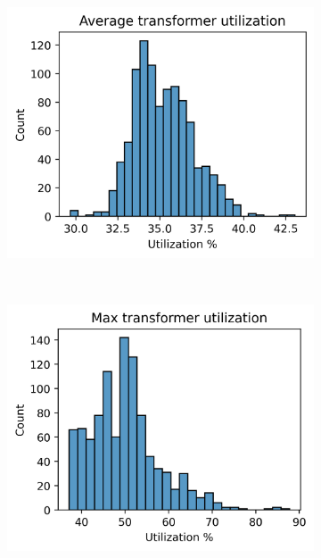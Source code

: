 \begin{figure}[H]
\begin{subfigure}{.33\textwidth}
    \caption{}
    \label{fig:result:suburban:histograms:max_cable}
  \end{subfigure}
  \begin{subfigure}{.33\textwidth}
      \centering
      \includegraphics[width=\linewidth]{img/switchstate_exploring/swiss_suburb/histograms/avg_trafo_util.png}
      \caption{}
      \label{fig:result:suburban:histograms:avg_trafo}
    \end{subfigure}\\
    \begin{subfigure}{.33\textwidth}
      \centering
      \includegraphics[width=\linewidth]{img/switchstate_exploring/swiss_suburb/histograms/max_trafo_util.png}

\end{subfigure}
\end{figure}

